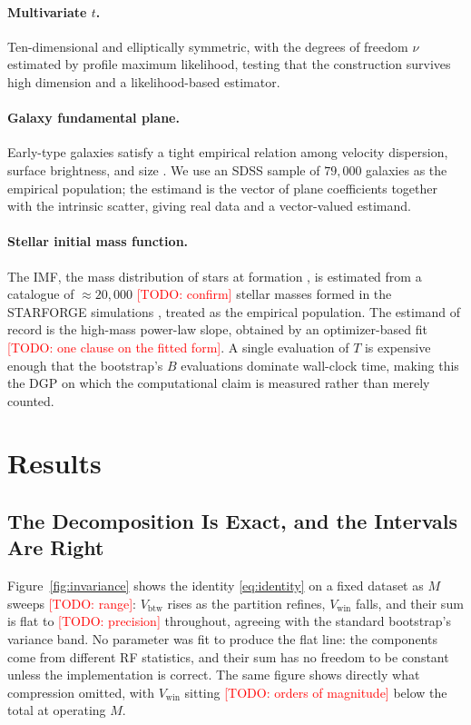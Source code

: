 \documentclass[runningheads]{llncs}
\newcommand{\todo}[1]{\textcolor{red}{[TODO: #1]}}
\newcommand{\Vcell}{V_{\mathrm{btw}}}
\newcommand{\Vwithin}{V_{\mathrm{win}}}
\begin{document}
\paragraph{Multivariate $t$.} Ten-dimensional and elliptically symmetric, with the degrees of freedom $\nu$ estimated by profile maximum likelihood, testing that the construction survives high dimension and a likelihood-based estimator.

\paragraph{Galaxy fundamental plane.} Early-type galaxies satisfy a tight empirical relation among velocity dispersion, surface brightness, and size \cite{djorgovski1987,dressler1987}. We use an SDSS sample of $79{,}000$ galaxies \cite{bernardi2003} as the empirical population; the estimand is the vector of plane coefficients together with the intrinsic scatter, giving real data and a vector-valued estimand.

\paragraph{Stellar initial mass function.} The IMF, the mass distribution of stars at formation \cite{salpeter1955,kroupa2001,chabrier2003}, is estimated from a catalogue of $\approx 20{,}000$ \todo{confirm} stellar masses formed in the STARFORGE simulations \cite{grudic2021}, treated as the empirical population. The estimand of record is the high-mass power-law slope, obtained by an optimizer-based fit \todo{one clause on the fitted form}. A single evaluation of $T$ is expensive enough that the bootstrap's $B$ evaluations dominate wall-clock time, making this the DGP on which the computational claim is measured rather than merely counted.


\section{Results}\label{sec:results}

\subsection{The Decomposition Is Exact, and the Intervals Are Right}\label{sec:res-valid}

Figure~\ref{fig:invariance} shows the identity \eqref{eq:identity} on a fixed dataset as $M$ sweeps \todo{range}: $\Vcell$ rises as the partition refines, $\Vwithin$ falls, and their sum is flat to \todo{precision} throughout, agreeing with the standard bootstrap's variance band. No parameter was fit to produce the flat line: the components come from different RF statistics, and their sum has no freedom to be constant unless the implementation is correct. The same figure shows directly what compression omitted, with $\Vwithin$ sitting \todo{orders of magnitude} below the total at operating $M$.
\end{document}
